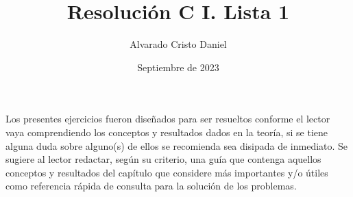 \documentclass[12pt]{article}
\begin{document}
\title{Resolución C I. Lista 1}
\author{Alvarado Cristo Daniel}
\date{Septiembre de 2023}
\maketitle

Los presentes ejercicios fueron diseñados para ser resueltos conforme el lector vaya comprendiendo los conceptos y resultados dados en la teoría, si se tiene alguna duda sobre alguno(s) de ellos se recomienda sea disipada de inmediato. Se sugiere al lector redactar, según su criterio, una guía que contenga aquellos conceptos y resultados del capítulo que considere más importantes y/o útiles como referencia
rápida de consulta para la solución de los problemas.

\renewcommand{\labelenumi}{\textbf{1.\theenumi.}}
\renewcommand{\labelenumii}{\textbf{\Roman{enumii}.}}
\providecommand{\abs}[1]{\left| #1 \right|}
\def\proof{\textit{Solución:}\\}
\end{document}

